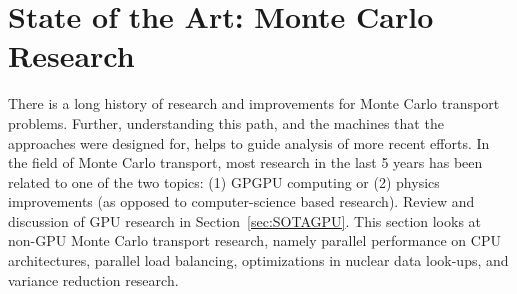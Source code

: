 \section{ \textbf{ State of the Art: Monte Carlo Research} }

There is a long history of research and improvements for Monte Carlo transport problems.
%
Further, understanding this path, and the machines that the approaches were designed for, helps to guide analysis of more recent efforts.
%
In the field of Monte Carlo transport, most research in the last 5 years has been related to one of the two topics: (1) GPGPU computing or (2) physics improvements (as opposed to computer-science based research).
%
Review and discussion of GPU research in Section~\ref{sec:SOTAGPU}.
%
This section looks at non-GPU Monte Carlo transport research, namely parallel performance on CPU architectures, parallel load balancing, optimizations in nuclear data look-ups, and variance reduction research.
%
